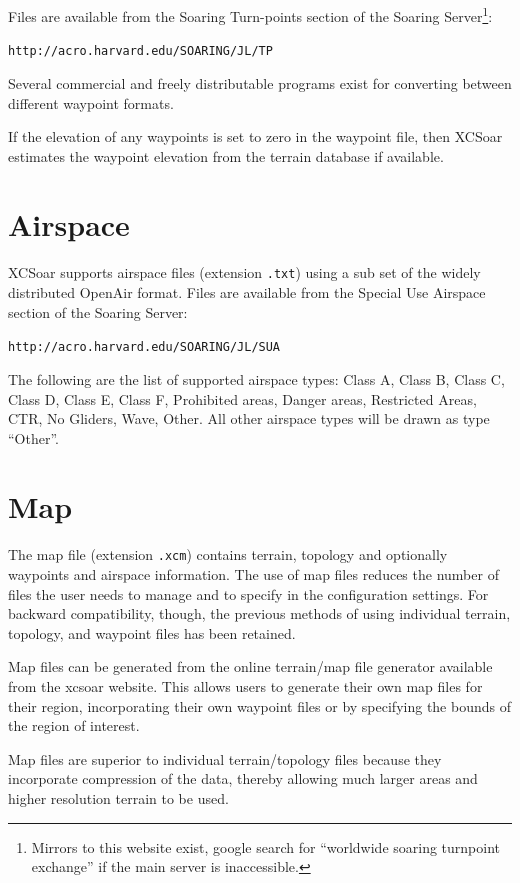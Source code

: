 \documentclass[a4paper,12pt]{refrep}
\begin{document}
Files are available from the Soaring Turn-points section of the
Soaring Server\footnote{Mirrors to this website exist, google search
for ``worldwide soaring turnpoint exchange'' if the main server is
inaccessible.}:

\verb|http://acro.harvard.edu/SOARING/JL/TP|

Several commercial and freely distributable programs exist for
converting between different waypoint formats.

If the elevation of any waypoints is set to zero in the waypoint file,
then XCSoar estimates the waypoint elevation from the terrain database
if available.

\section{Airspace}

XCSoar supports airspace files (extension \verb|.txt|) using a sub set
of the widely distributed OpenAir format. Files are available from the
Special Use Airspace section of the Soaring Server:

\verb|http://acro.harvard.edu/SOARING/JL/SUA|

The following are the list of supported airspace types: Class A, Class
B, Class C, Class D, Class E, Class F, Prohibited areas, Danger areas,
Restricted Areas, CTR, No Gliders, Wave, Other.  All other airspace
types will be drawn as type ``Other''.

\section{Map}\label{sec:map}

The map file (extension \verb|.xcm|) contains terrain, topology and
optionally waypoints and airspace information.  The use of map files
reduces the number of files the user needs to manage and to specify in
the configuration settings.  For backward compatibility, though, the
previous methods of using individual terrain, topology, and waypoint
files has been retained.

Map files can be generated from the online terrain/map file generator
available from the xcsoar website.  This allows users to generate
their own map files for their region, incorporating their own waypoint
files or by specifying the bounds of the region of interest.

Map files are superior to individual terrain/topology files because
they incorporate compression of the data, thereby allowing much larger
areas and higher resolution terrain to be used.
\end{document}
